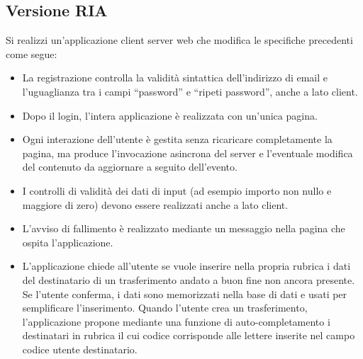 \documentclass{article}
\begin{document}
	\subsection{Versione RIA}
		Si realizzi un’applicazione client server web che modifica le specifiche precedenti come segue:
		\begin{itemize}
		\item La registrazione controlla la validità sintattica dell’indirizzo di email e l’uguaglianza tra
		i campi “password” e “ripeti password”, anche a lato client.
		\item Dopo il login, l’intera applicazione è realizzata con un’unica pagina.
		\item 	Ogni interazione dell’utente è gestita senza ricaricare completamente la pagina, ma
		produce l’invocazione asincrona del server e l’eventuale modifica del contenuto da
		aggiornare a seguito dell’evento.
		\item I controlli di validità dei dati di input (ad esempio importo non nullo e maggiore di zero)
		devono essere realizzati anche a lato client.
		\item L’avviso di fallimento è realizzato mediante un messaggio nella pagina che ospita
		l’applicazione.
		\item L’applicazione chiede all’utente se vuole inserire nella propria rubrica i dati del
		destinatario di un trasferimento andato a buon fine non ancora presente. Se l’utente
		conferma, i dati sono memorizzati nella base di dati e usati per semplificare
		l’inserimento. Quando l’utente crea un trasferimento, l’applicazione propone mediante
		una funzione di auto-completamento i destinatari in rubrica il cui codice corrisponde
		alle lettere inserite nel campo codice utente destinatario.
		\end{itemize}
	
	\pagebreak
\end{document}

